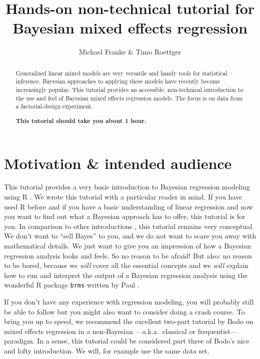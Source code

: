 \documentclass[nobib]{tufte-handout}
\title{Hands-on non-technical tutorial for Bayesian mixed effects regression}
\author{Michael Franke \& Timo Roettger}
\date{}
\begin{document}
\maketitle

\begin{abstract}
  \noindent Generalized linear mixed models are very versatile and handy tools for statistical inference. Bayesian approaches to applying these models have recently become increasingly popular. This tutorial provides an accessible, non-technical introduction to the use and feel of Bayesian mixed effects regression models. The focus is on data from a factorial-design experiment. \\
  
  \medskip
  
  \noindent \textbf{This tutorial should take you about 1 hour.}
\end{abstract}

\section{Motivation \& intended audience}

This tutorial provides a very basic introduction to Bayesian regression modeling using R \citep{Manual}. We wrote this tutorial with a particular reader in mind. If you have used R before and if you have a basic understanding of linear regression and now you want to find out what a Bayesian approach has to offer, this tutorial is for you. In comparison to other introductions \citep[e.g.][]{SorensenHohensteinb2016:Bayesian-linear}, this tutorial remains very conceptual. We don’t want to ``sell Bayes'' to you, and we do not want to scare you away with mathematical details. We just want to give you an impression of how a Bayesian regression analysis looks and feels. So no reason to be afraid! But also: no reason to be bored, because we \emph{will} cover all the essential concepts and we \emph{will} explain how to run and interpret the output of a Bayesian regression analysis using the wonderful R package \texttt{brms} written by Paul \citep{buerkner2016brms}.

If you don’t have any experience with regression modeling, you will probably still be able to follow but you might also want to consider doing a crash course. To bring you up to speed, we recommend the excellent two-part tutorial by Bodo \citep{Winter2013:Linear-models-a} on mixed effects regression in a non-Bayesian ---a.k.a.~classical or frequentist--- paradigm. In a sense, this tutorial could be considered part three of Bodo's nice and lofty introduction. We will, for example use the same data set.
\end{document}
